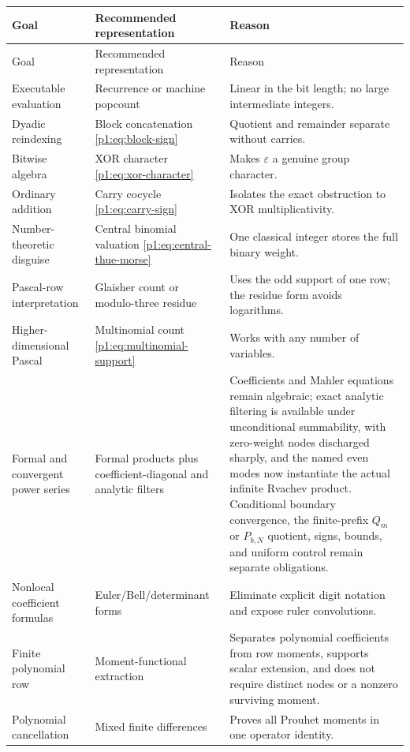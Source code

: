 \documentclass[11pt,oneside]{article}
\numberwithin{equation}{section}
\theoremstyle{definition}
\theoremstyle{remark}
\newcommand{\eps}{\varepsilon}
\begin{document}
\renewcommand{\arraystretch}{1.16}
\begin{longtable}{@{}>{\raggedright\arraybackslash}p{}>{\raggedright\arraybackslash}p{}>{\raggedright\arraybackslash}p{}@{}}
\toprule
Goal & Recommended representation & Reason \\
\midrule
\endfirsthead
\toprule
Goal & Recommended representation & Reason \\
\midrule
\endhead
Executable evaluation & Recurrence or machine popcount & Linear in the bit length; no large intermediate integers. \\
Dyadic reindexing & Block concatenation \eqref{p1:eq:block-sign} & Quotient and remainder separate without carries. \\
Bitwise algebra & XOR character \eqref{p1:eq:xor-character} & Makes \(\eps\) a genuine group character. \\
Ordinary addition & Carry cocycle \eqref{p1:eq:carry-sign} & Isolates the exact obstruction to XOR multiplicativity. \\
Number-theoretic disguise & Central binomial valuation \eqref{p1:eq:central-thue-morse} & One classical integer stores the full binary weight. \\
Pascal-row interpretation & Glaisher count or modulo-three residue & Uses the odd support of one row; the residue form avoids logarithms. \\
Higher-dimensional Pascal & Multinomial count \eqref{p1:eq:multinomial-support} & Works with any number of variables. \\
Formal and convergent power series & Formal products plus coefficient-diagonal and analytic filters & Coefficients and Mahler equations remain algebraic; exact analytic filtering is available under unconditional summability, with zero-weight nodes discharged sharply, and the named even modes now instantiate the actual infinite Rvachev product.  Conditional boundary convergence, the finite-prefix \(Q_m\) or \(P_{b,N}\) quotient, signs, bounds, and uniform control remain separate obligations. \\
Nonlocal coefficient formulas & Euler/Bell/determinant forms & Eliminate explicit digit notation and expose ruler convolutions. \\
Finite polynomial row & Moment-functional extraction & Separates polynomial coefficients from row moments, supports scalar extension, and does not require distinct nodes or a nonzero surviving moment. \\
Polynomial cancellation & Mixed finite differences & Proves all Prouhet moments in one operator identity. \\

\end{longtable}
\end{document}
